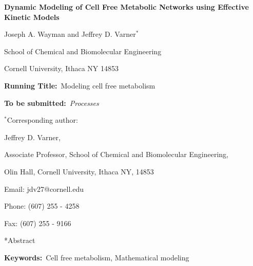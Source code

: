 \documentclass[12pt]{article}
\makeatletter
\renewcommand\section{\@startsection
	{subsection}{2}{0mm}
	{-0.2in}
	{0.05\baselineskip}
	{\normalfont\large\bfseries}}
\makeatother
\begin{document}
\begin{titlepage}
{\par\centering\textbf{\Large Dynamic Modeling of Cell Free Metabolic Networks using Effective Kinetic Models}}
\vspace{0.05in}
{\par \centering \large{ Joseph A. Wayman and Jeffrey D. Varner$^{*}$}}
\vspace{0.10in}
{\par \centering \large{School of Chemical and Biomolecular Engineering}}
{\par \centering \large{Cornell University, Ithaca NY 14853}}
\vspace{0.1in}
{\par \centering \textbf{Running Title:}~Modeling cell free metabolism}
\vspace{0.1in}
{\par \centering \textbf{To be submitted:}~\emph{Processes}}
\vspace{0.5in}
{\par \centering $^{*}$Corresponding author:}
{\par \centering Jeffrey D. Varner,}
{\par \centering Associate Professor, School of Chemical and Biomolecular Engineering,}
{\par {} Olin Hall, Cornell University, Ithaca NY, 14853} 
{\par \centering Email: jdv27@cornell.edu} 
{\par \centering Phone: (607) 255 - 4258}
{\par \centering Fax: (607) 255 - 9166}
\end{titlepage}
\date{}
\thispagestyle{empty}
\pagebreak
\section*{Abstract}

{\noindent \textbf{Keywords:}~Cell free metabolism, Mathematical modeling}

\pagebreak

\setcounter{page}{1}

\linenumbers
\end{document}
